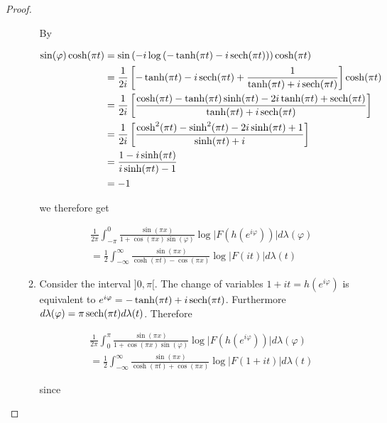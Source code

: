 \begin{proof}
\begin{enumerate}[label = \textbf{(\roman*)}]
\begin{enumerate}[label = \textbf{\alph*.}]
				By 

				\begin{gather*}
					\begin{aligned}
						\sin(\varphi)\cosh(\pi t) &= \sin\left( -i\log\left( -\tanh (\pi t) - i \operatorname{sech}(\pi t) \right)\right) \cosh(\pi t)\\
						&= \frac{1}{2i} \left[ -\tanh(\pi t) - i\operatorname{sech}(\pi t) + \frac{1}{\tanh(\pi t) + i\operatorname{sech}(\pi t) }\right]\cosh(\pi t)\\
						&= \frac{1}{2i} \left[ \frac{\cosh(\pi t) - \tanh(\pi t) \sinh(\pi t) - 2i\tanh(\pi t) + \operatorname{sech}(\pi t)}{\tanh(\pi t) + i\operatorname{sech}(\pi t)}\right]\\
						&= \frac{1}{2i} \left[ \frac{\cosh^2(\pi t) - \sinh^2(\pi t) - 2i \sinh(\pi t) + 1}{\sinh(\pi t) + i}\right]\\
						&= \frac{1 - i\sinh(\pi t)}{i\sinh(\pi t) - 1}\\
						&= -1
					\end{aligned}
				\end{gather*}

				we therefore get

				\begin{multline}
					\frac{1}{2\pi} \int_{-\pi}^0 \frac{\sin(\pi x)}{1 + \cos(\pi x)\sin(\varphi)} \log \vert F(h(e^{i\varphi}))\vert d\lambda(\varphi)\\ = \frac{1}{2}\int_{-\infty}^\infty\frac{\sin(\pi x)}{\cosh(\pi t) - \cos(\pi x)} \log\vert F(it) \vert d\lambda(t)
				\end{multline}

		\item Consider the interval $]0,\pi[$. The change of variables $1 + it = h(e^{i\varphi})$ is equivalent to $e^{i\varphi} = - \tanh(\pi t) + i\operatorname{sech}(\pi t)$. Furthermore $d\lambda(\varphi) = \pi \operatorname{sech}(\pi t) d\lambda(t)$. Therefore 

				\begin{multline}
					\frac{1}{2\pi} \int_0^\pi \frac{\sin(\pi x)}{1 + \cos(\pi x)\sin(\varphi)} \log \vert F(h(e^{i\varphi}))\vert d\lambda(\varphi)\\ = \frac{1}{2}\int_{-\infty}^\infty\frac{\sin(\pi x)}{\cosh(\pi t) + \cos(\pi x)} \log\vert F(1 + it) \vert d\lambda(t)
				\end{multline}

				since


\end{enumerate}
\end{enumerate}
\end{proof}
